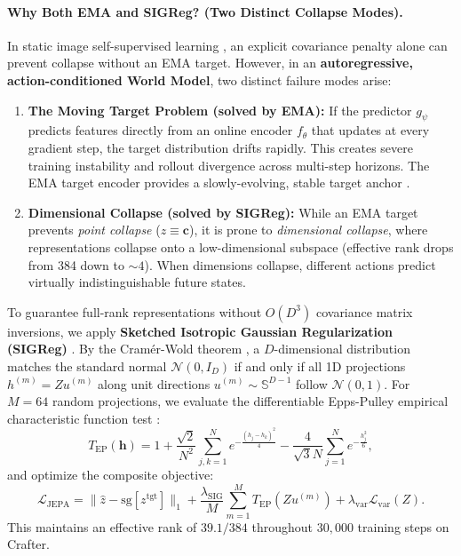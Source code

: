 \documentclass[11pt,letterpaper]{article}
\begin{document}
\paragraph{Why Both EMA and SIGReg? (Two Distinct Collapse Modes).}
In static image self-supervised learning \cite{balestriero2025lejepa,bardes2022vicreg}, an explicit covariance penalty alone can prevent collapse without an EMA target. However, in an \textbf{autoregressive, action-conditioned World Model}, two distinct failure modes arise:
\begin{enumerate}
  \item \textbf{The Moving Target Problem (solved by EMA):} If the predictor $g_\psi$ predicts features directly from an online encoder $f_\theta$ that updates at every gradient step, the target distribution drifts rapidly. This creates severe training instability and rollout divergence across multi-step horizons. The EMA target encoder provides a slowly-evolving, stable target anchor \cite{grill2020byol}.
  \item \textbf{Dimensional Collapse (solved by SIGReg):} While an EMA target prevents \emph{point collapse} ($z \equiv \mathbf{c}$), it is prone to \emph{dimensional collapse}, where representations collapse onto a low-dimensional subspace (effective rank drops from 384 down to $\sim 4$). When dimensions collapse, different actions predict virtually indistinguishable future states.
\end{enumerate}
To guarantee full-rank representations without $O(D^3)$ covariance matrix inversions, we apply \textbf{Sketched Isotropic Gaussian Regularization (SIGReg)} \cite{balestriero2025lejepa}. By the Cram\'er-Wold theorem \cite{cramer1936theorems}, a $D$-dimensional distribution matches the standard normal $\mathcal{N}(0, I_D)$ if and only if all 1D projections $h^{(m)} = Z u^{(m)}$ along unit directions $u^{(m)} \sim \mathbb{S}^{D-1}$ follow $\mathcal{N}(0, 1)$. For $M=64$ random projections, we evaluate the differentiable Epps-Pulley empirical characteristic function test \cite{epps1983test}:
\begin{equation}
  T_{\text{EP}}(\mathbf{h}) = 1 + \frac{\sqrt{2}}{N^2} \sum_{j,k=1}^N e^{-\frac{(h_j - h_k)^2}{4}} - \frac{4}{\sqrt{3} N} \sum_{j=1}^N e^{-\frac{h_j^2}{6}},
\end{equation}
and optimize the composite objective:
\begin{equation}
  \mathcal{L}_{\text{JEPA}} = \|\hat{z} - \text{sg}[z^{\text{tgt}}]\|_1 + \frac{\lambda_{\text{SIG}}}{M}\sum_{m=1}^M T_{\text{EP}}(Z u^{(m)}) + \lambda_{\text{var}}\mathcal{L}_{\text{var}}(Z).
\end{equation}
This maintains an effective rank of $39.1 / 384$ throughout $30{,}000$ training steps on Crafter.
\end{document}
